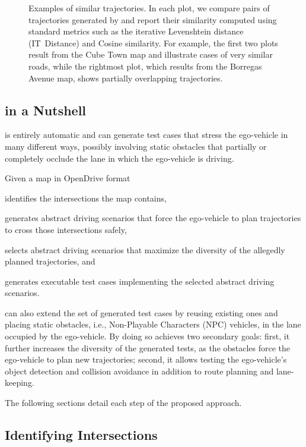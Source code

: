 \documentclass[conference]{IEEEtran}
\begin{document}
\begin{figure}[t]
\endminipage
\caption{Examples of similar trajectories. In each plot, we compare pairs of trajectories generated by \tool and report their similarity computed using standard metrics such as the iterative Levenshtein distance (IT~Distance) and Cosine similarity. For example, the first two plots result from the Cube Town map and illustrate cases of very similar roads, while the rightmost plot, which results from the Borregas Avenue map, shows partially overlapping trajectories.}
\label{fig:similarity}
\end{figure}


\subsection{\tool in a Nutshell}
\tool is entirely automatic and can generate test cases that stress the ego-vehicle in many different ways, possibly involving static obstacles that partially or completely occlude the lane in which the ego-vehicle is driving. 

Given a map in OpenDrive format \tool \begin{inparaenum}[(1)]
\item identifies the intersections the map contains, 
\item generates abstract driving scenarios that force the ego-vehicle to plan trajectories to cross those intersections safely, \item selects abstract driving scenarios that maximize the diversity of the allegedly planned trajectories, and \item generates executable test cases implementing the selected abstract driving scenarios.
\end{inparaenum}

\tool can also extend the set of generated test cases by reusing existing ones and placing static obstacles, i.e., Non-Playable Characters (NPC) vehicles, in the lane occupied by the ego-vehicle. By doing so \tool achieves two secondary goals: first, it further increases the diversity of the generated tests, as the obstacles force the ego-vehicle to plan new trajectories; second, it allows testing the ego-vehicle's object detection and collision avoidance in addition to route planning and lane-keeping.

The following sections detail each step of the proposed approach.

\subsection{Identifying Intersections}
\end{document}
